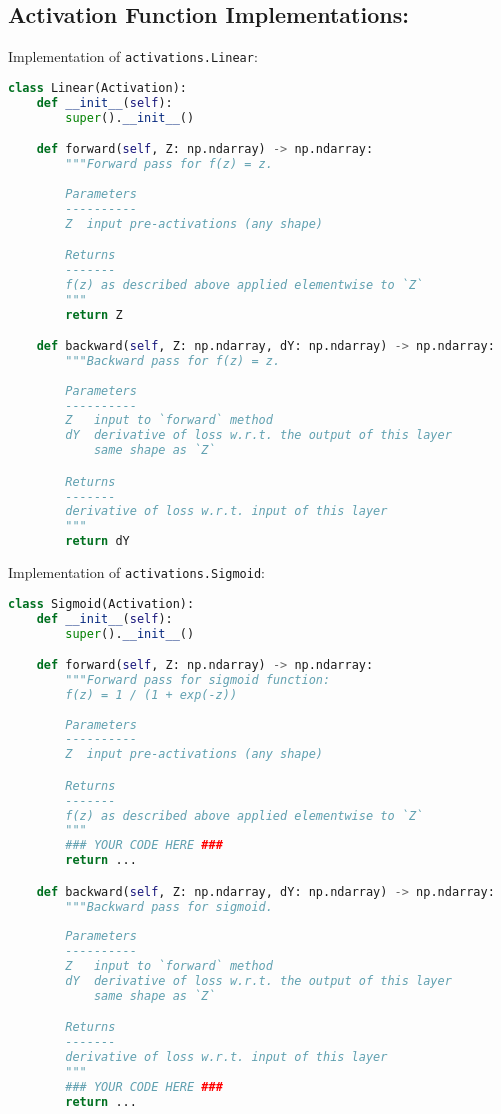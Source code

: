 \subsection{Activation Function Implementations:}

Implementation of \texttt{activations.Linear}:

\begin{lstlisting}[language=Python]
class Linear(Activation):
    def __init__(self):
        super().__init__()

    def forward(self, Z: np.ndarray) -> np.ndarray:
        """Forward pass for f(z) = z.
        
        Parameters
        ----------
        Z  input pre-activations (any shape)

        Returns
        -------
        f(z) as described above applied elementwise to `Z`
        """
        return Z

    def backward(self, Z: np.ndarray, dY: np.ndarray) -> np.ndarray:
        """Backward pass for f(z) = z.
        
        Parameters
        ----------
        Z   input to `forward` method
        dY  derivative of loss w.r.t. the output of this layer
            same shape as `Z`

        Returns
        -------
        derivative of loss w.r.t. input of this layer
        """
        return dY

\end{lstlisting}

Implementation of \texttt{activations.Sigmoid}:

\begin{lstlisting}[language=Python]
class Sigmoid(Activation):
    def __init__(self):
        super().__init__()

    def forward(self, Z: np.ndarray) -> np.ndarray:
        """Forward pass for sigmoid function:
        f(z) = 1 / (1 + exp(-z))
        
        Parameters
        ----------
        Z  input pre-activations (any shape)

        Returns
        -------
        f(z) as described above applied elementwise to `Z`
        """
        ### YOUR CODE HERE ###
        return ...

    def backward(self, Z: np.ndarray, dY: np.ndarray) -> np.ndarray:
        """Backward pass for sigmoid.
        
        Parameters
        ----------
        Z   input to `forward` method
        dY  derivative of loss w.r.t. the output of this layer
            same shape as `Z`

        Returns
        -------
        derivative of loss w.r.t. input of this layer
        """
        ### YOUR CODE HERE ###
        return ...

\end{lstlisting}


